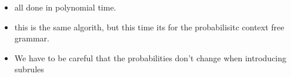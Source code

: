 \documentclass[11pt]{article}
\begin{document}
\begin{minipage}[l]{.5\linewidth}
    \begin{figure}[H]
        \centering
    \end{figure}    
\end{minipage}\hfill
\begin{minipage}[r]{.48\linewidth}
    \begin{itemize}
        \item all done in polynomial time.
    \end{itemize}
\end{minipage}

\begin{minipage}[l]{.5\linewidth}
    \begin{figure}[H]
        \centering
    \end{figure}    
\end{minipage}\hfill
\begin{minipage}[r]{.48\linewidth}
    \begin{itemize}
        \item this is the same algorith, but this time its for the probabilisitc context free grammar.
        \item We have to be careful that the probabilities don't change when introducing subrules
    \end{itemize}
\end{minipage}
\end{document}
